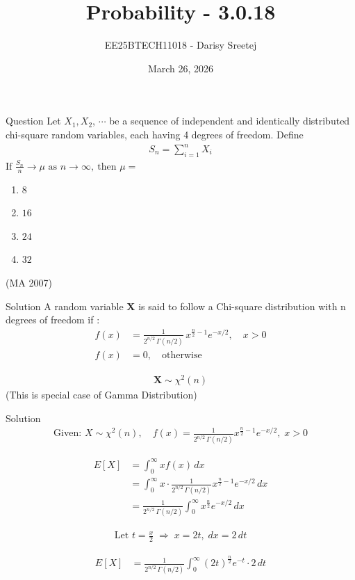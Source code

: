 \documentclass{beamer}
\title %
{Probability - 3.0.18}
\date{March 26, 2026}
\author %
{EE25BTECH11018 - Darisy Sreetej}
\begin{document}
\frame{\titlepage}

\begin{frame}{Question}
Let $X_1, X_2$, $\cdots$ be a sequence of independent and identically distributed chi-square
random variables, each having 4 degrees of freedom. Define
\begin{align*}
    S_n = \sum_{i=1}^{n} X_i
\end{align*}
$
\text{If } \frac{S_n}{n} \to \mu \text{ as } n \to \infty,\ \text{then } \mu =
$
\quad
 \begin{enumerate}

\item   $8$ 
\item   $16$
 \item $24$
\item  $32$
 \end{enumerate}
 \hfill(MA 2007)
\end{frame}
\begin{frame}{Solution}
A random variable  \textbf{X} is said to follow a Chi-square distribution with n  degrees of freedom if :
\begin{align}
f(x) &= \frac{1}{2^{n/2}\,\Gamma(n/2)} \, x^{\frac{n}{2} - 1} e^{-x/2} , \quad x > 0 \\
f(x) &= 0, \quad \text{otherwise}
\end{align}

\begin{align}
\mathbf{X} \sim \chi^2(n)
\end{align}
(This is special case of Gamma Distribution)
\end{frame}
\begin{frame}{Solution}
\begin{align}
\text{Given: } X \sim \chi^2(n), \quad 
f(x) = \frac{1}{2^{n/2}\,\Gamma(n/2)} x^{\frac{n}{2}-1} e^{-x/2}, \; x>0
\end{align}

\begin{align}
E[X] &= \int_{0}^{\infty} x f(x)\,dx \\
&= \int_{0}^{\infty} x \cdot \frac{1}{2^{n/2}\,\Gamma(n/2)} x^{\frac{n}{2}-1} e^{-x/2}\,dx \\
&= \frac{1}{2^{n/2}\,\Gamma(n/2)} \int_{0}^{\infty} x^{\frac{n}{2}} e^{-x/2}\,dx
\end{align}

\begin{align}
\text{Let } t = \frac{x}{2} \;\Rightarrow\; x = 2t,\; dx = 2\,dt
\end{align}

\begin{align}
E[X] &= \frac{1}{2^{n/2}\,\Gamma(n/2)} 
\int_{0}^{\infty} (2t)^{\frac{n}{2}} e^{-t} \cdot 2\,dt 
\end{align}
\end{frame}
\end{document}
